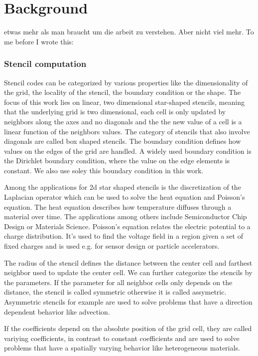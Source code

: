 \chapter{Background}
etwas mehr als man braucht um die arbeit zu verstehen. Aber nicht viel mehr.
To me before I wrote this:
\subsection{Stencil computation}
Stencil codes can be categorized by various properties like the dimensionality of the grid, the locality of the stencil, the boundary condition or the shape.
The focus of this work lies on linear, two dimensional star-shaped stencils, meaning that the underlying grid is two dimensional, each cell is only updated by neighbors along the axes and no diagonals and the the new value of a cell is a linear function of the neighbors values.
The category of stencils that also involve diagonals are called box shaped stencils.
The boundary condition defines how values on the edges of the grid are handled. A widely used boundary condition is the Dirichlet boundary condition, where the value on the edge elements is constant. We also use soley this boundary condition in this work.

Among the applications for 2d star shaped stencils is the discretization of the Laplacian operator which can be used to solve the heat equation and Poisson's equation.
The heat equation describes how temperature diffuses through a material over time. The applications among others include Semiconductor Chip Design or Materials Science.
Poisson's equation relates the electric potential to a charge distribution. It's used to find the voltage field in a region given a set of fixed charges and is used e.g. for sensor design or particle accelerators.

The radius of the stencil defines the distance between the center cell and farthest neighbor used to update the center cell. We can further categorize the stencils by the parameters. If the parameter for all neighbor cells only depends on the distance, the stencil is called symmetric otherwise it is called assymetric.
Asymmetric stencils for example are used to solve problems that have a direction dependent behavior like advection.

If the coefficients depend on the absolute position of the grid cell, they are called variying coefficients, in contrast to constant coefficients and are used to solve problems that have a spatially varying behavior like heterogeneous materials.

